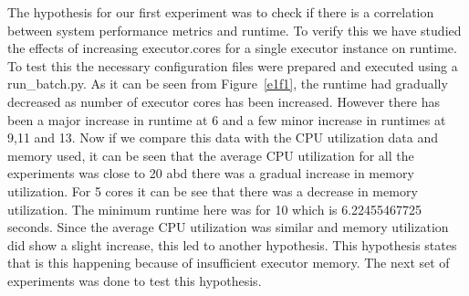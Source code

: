 \documentclass[11pt]{article}
\begin{document}
The hypothesis for our first experiment was to check if there is a correlation between system performance metrics and runtime. To verify this we have studied the effects of increasing executor.cores for a single executor instance on runtime. To test this the necessary configuration files were prepared and executed using a run\_batch.py. As it can be seen from Figure~\ref{e1f1}, the runtime had gradually decreased as number of executor cores has been increased. However there has been a major increase in runtime at 6 and a few minor increase in runtimes at 9,11 and 13. Now if we compare this data with the CPU utilization data and memory used,  it can be seen that the average CPU utilization for all the experiments was close to 20 abd there was a gradual increase in memory utilization. For 5 cores it can be see that there was a decrease in memory utilization. 
The minimum runtime here was for 10 which is 6.22455467725 seconds. Since the average CPU utilization was similar and memory utilization did show a slight increase, this led to another hypothesis. This hypothesis states that is this happening because of insufficient executor memory. The next set of experiments was done to test this hypothesis.
\end{document}
